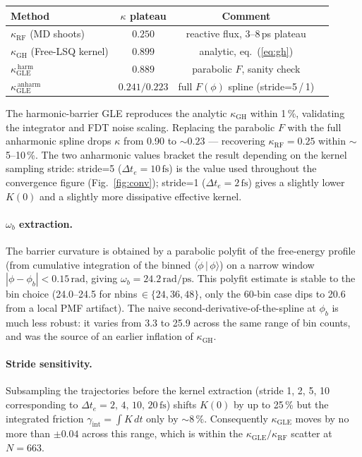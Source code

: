 \documentclass[11pt]{article}
\newcommand{\rad}{\mathrm{rad}}
\newcommand{\ps}{\mathrm{ps}}
\newcommand{\fs}{\mathrm{fs}}
\newcommand{\GH}{\mathrm{GH}}
\newcommand{\RF}{\mathrm{RF}}
\newcommand{\GLE}{\mathrm{GLE}}
\begin{document}
\begin{center}
\begin{tabular}{lccc}
\toprule
Method & $\kappa$ plateau & Comment \\
\midrule
$\kappa_\RF$ (MD shoots)             & $\mathbf{0.250}$       & reactive flux, 3--8\,ps plateau \\
$\kappa_\GH$ (Free-LSQ kernel)        & $0.899$                 & analytic, eq.~(\ref{eq:gh}) \\
$\kappa_\GLE^{\,\mathrm{harm}}$       & $0.889$                 & parabolic $F$, sanity check \\
$\kappa_\GLE^{\,\mathrm{anharm}}$     & $\mathbf{0.241/0.223}$  & full $F(\phi)$ spline (stride=5\,/\,1) \\
\bottomrule
\end{tabular}
\end{center}
The harmonic-barrier GLE reproduces the analytic $\kappa_\GH$ within
1\,\%, validating the integrator and FDT noise scaling. Replacing the
parabolic $F$ with the full anharmonic spline drops $\kappa$ from 0.90
to ${\sim}0.23$ --- recovering $\kappa_\RF = 0.25$ within $\sim$5--10\,\%.
The two anharmonic values bracket the result depending on the kernel
sampling stride: stride=5 ($\Delta t_e = 10\,\fs$) is the value used
throughout the convergence figure (Fig.~\ref{fig:conv}); stride=1
($\Delta t_e = 2\,\fs$) gives a slightly lower $K(0)$ and a slightly
more dissipative effective kernel.

\paragraph{$\omega_b$ extraction.}
The barrier curvature is obtained by a parabolic polyfit of the
free-energy profile (from cumulative integration of the binned
$\langle\ddot\phi\,|\,\phi\rangle$) on a narrow window
$|\phi - \phi_b| < 0.15\,\rad$, giving $\omega_b = 24.2\,\rad/\ps$.
This polyfit estimate is stable to the bin choice (24.0--24.5 for
nbins\,$\in\{24,36,48\}$, only the 60-bin case dips to 20.6 from a
local PMF artifact). The naive second-derivative-of-the-spline at
$\phi_b$ is much less robust: it varies from 3.3 to 25.9 across the
same range of bin counts, and was the source of an earlier inflation
of $\kappa_\GH$.

\paragraph{Stride sensitivity.}
Subsampling the trajectories before the kernel extraction (stride 1, 2,
5, 10 corresponding to $\Delta t_e = 2,\,4,\,10,\,20\,\fs$) shifts
$K(0)$ by up to 25\,\% but the integrated friction $\gamma_\mathrm{int}
= \int K\,dt$ only by $\sim 8\,\%$. Consequently $\kappa_\GLE$ moves by
no more than $\pm 0.04$ across this range, which is within the
$\kappa_\GLE/\kappa_\RF$ scatter at $N=663$.
\end{document}
